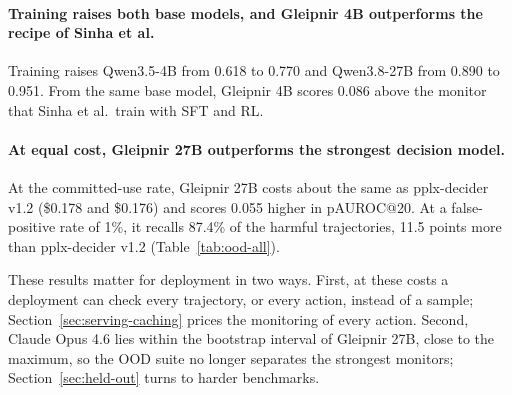 \paragraph{Training raises both base models, and Gleipnir 4B outperforms the recipe of Sinha et al.}
Training raises Qwen3.5-4B from 0.618 to 0.770 and Qwen3.8-27B from 0.890 to 0.951.
From the same base model, Gleipnir 4B scores 0.086 above the monitor that Sinha et al.\ train with SFT and RL.

\paragraph{At equal cost, Gleipnir 27B outperforms the strongest decision model.}
At the committed-use rate, Gleipnir 27B costs about the same as pplx-decider v1.2 (\$0.178 and \$0.176) and scores 0.055 higher in pAUROC@20.
At a false-positive rate of 1\%, it recalls 87.4\% of the harmful trajectories, 11.5 points more than pplx-decider v1.2 (Table~\ref{tab:ood-all}).

These results matter for deployment in two ways.
First, at these costs a deployment can check every trajectory, or every action, instead of a sample; Section~\ref{sec:serving-caching} prices the monitoring of every action.
Second, Claude Opus 4.6 lies within the bootstrap interval of Gleipnir 27B, close to the maximum, so the OOD suite no longer separates the strongest monitors; Section~\ref{sec:held-out} turns to harder benchmarks.
